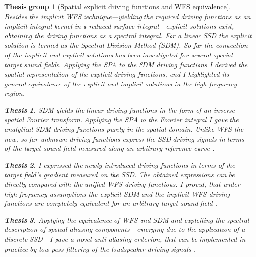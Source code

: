 \documentclass[10pt,twoside]{article}
\theoremstyle{thesisgroupstyle}
\newtheorem{thesisgroup}{Thesis group}
\theoremstyle{indented}
\newtheorem{thesis}{Thesis}[thesisgroup]
\begin{document}
\begin{thesisgroup}[Spatial explicit driving functions and WFS equivalence]
Besides the implicit WFS technique---yielding the required driving functions as an implicit integral kernel in a reduced surface integral---explicit solutions exist, obtaining the driving functions as a spectral integral.
For a linear SSD the explicit solution is termed as the \emph{Spectral Division Method (SDM)}.
So far the connection of the implicit and explicit solutions has been investigated for several special target sound fields.
Applying the SPA to the SDM driving functions I derived the spatial representation of the explicit driving functions, and I highlighted its general equivalence of the explicit and implicit solutions in the high-frequency region. \cite{Firtha2017:daga_booklet, Firtha2018:WFS_vs_SDM_booklet}
\begin{thesis}
SDM yields the linear driving functions in the form of an inverse spatial Fourier transform.
Applying the SPA to the Fourier integral I gave the analytical SDM driving functions purely in the spatial domain.
Unlike WFS the new, so far unknown driving functions express the SSD driving signals in terms of the target sound field measured along an arbitrary reference curve \cite{Firtha2017:daga_booklet}.\end{thesis}
\begin{thesis}
I expressed the newly introduced driving functions in terms of the target field's gradient measured on the SSD.
The obtained expressions can be directly compared with the unified WFS driving functions.
I proved, that under high-frequency assumptions the explicit SDM and the implicit WFS driving functions are completely equivalent for an arbitrary target sound field \cite{Firtha2018:WFS_vs_SDM_booklet}.\end{thesis}
\begin{thesis}
Applying the equivalence of WFS and SDM and exploiting the spectral description of spatial aliasing components---emerging due to the application of a discrete SSD---I gave 
a novel anti-aliasing criterion, that can be implemented in practice by low-pass filtering of the loudspeaker driving signals \cite{Firtha2018_daga_a_booklet}.
\end{thesis}
\end{thesisgroup}
\end{document}
